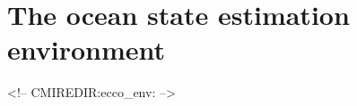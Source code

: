 \section{The ocean state estimation environment
\label{sectioneccoenv}}
\begin{rawhtml}
<!-- CMIREDIR:ecco_env: -->
\end{rawhtml}
